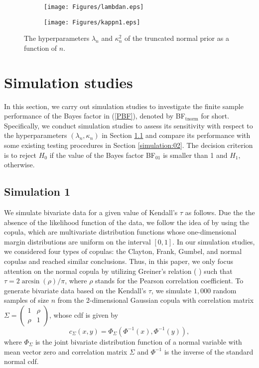 \documentclass[11pt]{article}
\begin{document}
\begin{figure}[!h]
\centering
 \begin{subfigure}[b]{0.48\textwidth}
         \centering
\texttt{[image: Figures/lambdan.eps]}
\caption{}
    \label{figa}
     \end{subfigure}
\begin{subfigure}[b]{0.48\textwidth}
\texttt{[image: Figures/kappn1.eps]}%
\caption{}
\label{figb}
 \end{subfigure}
\caption{The hyperparameters $\lambda_n$ and $\kappa_n^2$  of the truncated normal prior as a function of $n$.} \label{FIG:priormean}
\end{figure}


\section{Simulation studies} \label{section:03}

In this section, we carry out simulation studies to investigate the finite sample performance of the Bayes factor in (\ref{PBF}), denoted by BF$_\mathrm{tnorm}$ for short. Specifically, we conduct simulation studies to assess its sensitivity with respect to the hyperparameters $(\lambda_n, \kappa_n)$ in Section \ref{simulation:01} and compare its performance with some existing testing procedures in Section \ref{simulation:02}. The decision criterion is to reject $H_0$ if the value of the Bayes factor BF$_{01}$ is smaller than 1 and $H_1$, otherwise.

\subsection{Simulation 1} \label{simulation:01}

We simulate bivariate data for a given value of Kendall's $\tau$ as follows. Due the the absence of the likelihood function of the data, we follow the idea of \cite{Doorn:Ly:Wage:2018} by using the copula, which are multivariate distribution functions whose one-dimensional margin distributions are uniform on the interval $[0, 1]$. In our simulation studies, we considered four types of copulas: the Clayton, Frank, Gumbel, and normal copulas and reached similar conclusions. Thus, in this paper, we only focus attention on the normal copula by utilizing Greiner's relation (\citeauthor{Greiner:1909} \citeyear{Greiner:1909}) such that $\tau = 2 \arcsin(\rho)/ \pi$, where $\rho$ stands for the Pearson correlation coefficient. To generate bivariate data based on the Kendall's $\tau$, we simulate $1,000$ random samples of size $n$ from the 2-dimensional Gaussian copula with correlation matrix $\Sigma = \begin{pmatrix}
1 & \rho\\
\rho & 1
\end{pmatrix}$, whose cdf is given by
$$
c_\Sigma(x, y) = \Phi_\Sigma \left( \Phi^{-1}(x) , \Phi^{-1}(y)\right),
$$
where $\Phi_\Sigma$ is the joint bivariate distribution function of a normal variable with mean vector zero and correlation matrix $\Sigma$ and $\Phi^{-1}$ is the inverse of the standard normal cdf.
\end{document}
